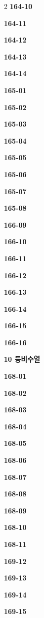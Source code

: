 \documentclass[10pt,a4paper]{article}
\begin{document}
\begin{multicols}{2}
\noindent\textbf{164-10}\ \par
\noindent\textbf{164-11}\ \par
\noindent\textbf{164-12}\ \par
\noindent\textbf{164-13}\ \par
\noindent\textbf{164-14}\ \par
\noindent\textbf{165-01}\ \par
\noindent\textbf{165-02}\ \par
\noindent\textbf{165-03}\ \par
\noindent\textbf{165-04}\ \par
\noindent\textbf{165-05}\ \par
\noindent\textbf{165-06}\ \par
\noindent\textbf{165-07}\ \par
\noindent\textbf{165-08}\ \par
\noindent\textbf{166-09}\ \par
\noindent\textbf{166-10}\ \par
\noindent\textbf{166-11}\ \par
\noindent\textbf{166-12}\ \par
\noindent\textbf{166-13}\ \par
\noindent\textbf{166-14}\ \par
\noindent\textbf{166-15}\ \par
\noindent\textbf{166-16}\ \par
\noindent\textbf{10 등비수열}\par\smallskip
\noindent\textbf{168-01}\ \par
\noindent\textbf{168-02}\ \par
\noindent\textbf{168-03}\ \par
\noindent\textbf{168-04}\ \par
\noindent\textbf{168-05}\ \par
\noindent\textbf{168-06}\ \par
\noindent\textbf{168-07}\ \par
\noindent\textbf{168-08}\ \par
\noindent\textbf{168-09}\ \par
\noindent\textbf{168-10}\ \par
\noindent\textbf{168-11}\ \par
\noindent\textbf{169-12}\ \par
\noindent\textbf{169-13}\ \par
\noindent\textbf{169-14}\ \par
\noindent\textbf{169-15}\ \par

\end{multicols}
\end{document}
